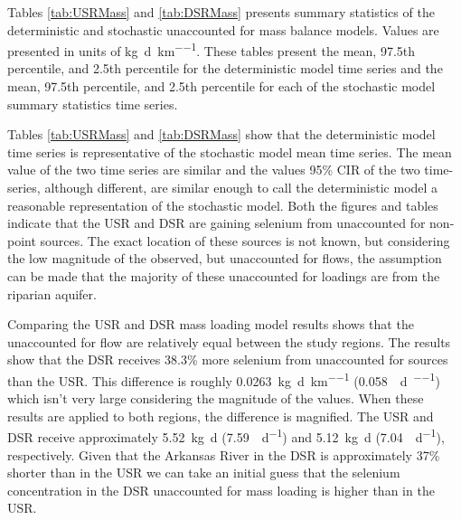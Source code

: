 Tables \ref{tab:USRMass} and \ref{tab:DSRMass} presents summary statistics of the deterministic and stochastic unaccounted for mass balance models.  Values are presented in units of \si{\kilo\gram\per\day\per\kilo\meter}.  These tables present the mean, 97.5th percentile, and 2.5th percentile for the deterministic model time series and the mean, 97.5th percentile, and 2.5th percentile for each of the stochastic model summary statistics time series.

\subtabletop
\begin{table}[htbp]
	\centering
	\caption[USR deterministic and stochastic dissolved selenium unaccounted for loading time-series results tables.]{USR deterministic and stochastic dissolved selenium unaccounted for loading time-series results tables.  Values are in units of \si{\kilo\gram\per\day\per\kilo\meter}.}
	\label{tab:USRMass}
	
	\tablevspace
\end{table}
\begin{table}[htbp]
	\centering
	\caption[DSR deterministic and stochastic dissolved selenium unaccounted for loading time-series results tables.]{DSR deterministic and stochastic dissolved selenium unaccounted for loading time-series results tables.  Values are in units of \si{\kilo\gram\per\day\per\kilo\meter}.}
	\label{tab:DSRMass}
	
\end{table}

Tables \ref{tab:USRMass} and \ref{tab:DSRMass} show that the deterministic model time series is representative of the stochastic model mean time series.  The mean value of the two time series are similar and the values 95\% CIR of the two time-series, although different, are similar enough to call the deterministic model a reasonable representation of the stochastic model.  Both the figures and tables indicate that the USR and DSR are gaining selenium from unaccounted for non-point sources.  The exact location of these sources is not known, but considering the low magnitude of the observed, but unaccounted for flows, the assumption can be made that the majority of these unaccounted for loadings are from the riparian aquifer.

Comparing the USR and DSR mass loading model results shows that the unaccounted for flow are relatively equal between the study regions.  The results show that the DSR receives 38.3\% more selenium from unaccounted for sources than the USR.  This difference is roughly \SI{0.0263}{\kilo\g\per\day\per\kilo\m} (\SI{0.058}{\pound\per\day\per\mile}) which isn't very large considering the magnitude of the values. When these results are applied to both regions, the difference is magnified.  The USR and DSR receive approximately \SI{5.52}{\kilo\g\day} (\SI{7.59}{\pound\per\day}) and \SI{5.12}{\kilo\g\day} (\SI{7.04}{\pound\per\day}), respectively.  Given that the Arkansas River in the DSR is approximately 37\% shorter than in the USR we can take an initial guess that the selenium concentration in the DSR unaccounted for mass loading is higher than in the USR.

